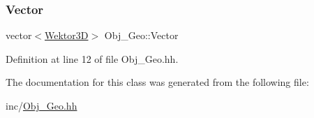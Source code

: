 \subsubsection{\texorpdfstring{Vector}{Vector}}
{\footnotesize\ttfamily vector$<$\hyperlink{_wektor3_d_8hh_ac353a272b38b4ad342f7181ad7bdb91a}{Wektor3D}$>$ Obj\+\_\+\+Geo\+::\+Vector}



Definition at line 12 of file Obj\+\_\+\+Geo.\+hh.



The documentation for this class was generated from the following file\+:\begin{DoxyCompactItemize}
\item 
inc/\hyperlink{_obj___geo_8hh}{Obj\+\_\+\+Geo.\+hh}\end{DoxyCompactItemize}
